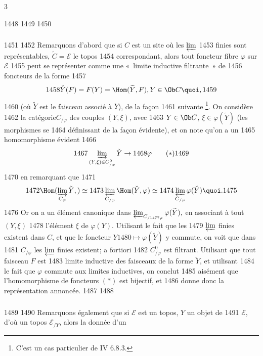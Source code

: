 3	\documentclass[10pt]{../fichiers-configuration-latex/smfart}
\begin{document}
  1448	
  1449	\setcounter{subsection}{9}
  1450	\subsubsection{}
  1451	
  1452	Remarquons d'abord que si $C$ est un site où les $\varprojlim$
  1453	finies sont représentables, $\widetilde{C} = ℰ$ le topos
  1454	correspondant, alors tout foncteur fibre $\varphi$ sur $ℰ$
  1455	peut se représenter comme une « limite inductive filtrante » de
  1456	foncteurs de la forme
  1457	$$
  1458	\check{Y} (F) = F(Y) = \Hom(\widetilde{Y}, F), Y \in \Ob C{\quoi},
  1459	$$
  1460	(où $\widetilde{Y}$ est le faisceau associé à $Y$), de la façon
  1461	suivante \footnote{C'est un cas particulier de IV 6.8.3.}. On considère
  1462	la catégorie\pageoriginale $C_{/\varphi}$ des couples $(Y, \xi)$, avec
  1463	$Y \in \Ob C$, $\xi \in \varphi (\widetilde{Y})$ (les morphismes se
  1464	définissant de la façon évidente), et on note qu'on a un
  1465	homomorphisme évident
  1466	\begin{equation*}
  1467	\varinjlim_{(Y, \xi)\in C^0_{/\varphi}} \check{Y} \to
  1468	\varphi\tag{$\ast$}
  1469	\end{equation*}
  1470	en remarquant que
  1471	$$
  1472	\Hom (\varinjlim_{C_{\varphi}} \check{Y},) \simeq
  1473	\varprojlim_{C_{/ \varphi}} \Hom(\check{Y}, \varphi) \simeq
  1474	\varprojlim_{C_{/ \varphi}} \varphi (\check{Y}){\quoi}.
  1475	$$
  1476	Or on a un élément canonique dans $\varprojlim_{C_{/
  1477	    \varphi}} \varphi(\widetilde{Y}),$ en associant à tout $(Y, \xi)$
  1478	l'élément $\xi$ de $\varphi (Y)$. Utilisant le fait que les
  1479	$\varprojlim$ finies existent dans $C$, et que le foncteur $Y
  1480	\mapsto \varphi(\widetilde{Y})$ y commute, on voit que dans
  1481	$C_{/\varphi}$ les $\varprojlim$ finies existent; a fortiori
  1482	$C^0_{/\varphi}$ est filtrant. Utilisant que tout faisceau $F$ est
  1483	limite inductive des faisceaux de la forme $\widetilde{Y}$, et utilisant
  1484	le fait que $\varphi$ commute aux limites inductives, on conclut
  1485	aisément que l'homomorphisme de foncteurs $(\ast)$ est bijectif, et
  1486	donne donc la représentation annoncée.
  1487	
  1488	\subsubsection{}
  1489	
  1490	Remarquons également que si $ℰ$ est un topos, $Y$ un objet de
  1491	$ℰ$, d'où un topos $ℰ_{/Y}$, alors la donnée d'un
\end{document}
